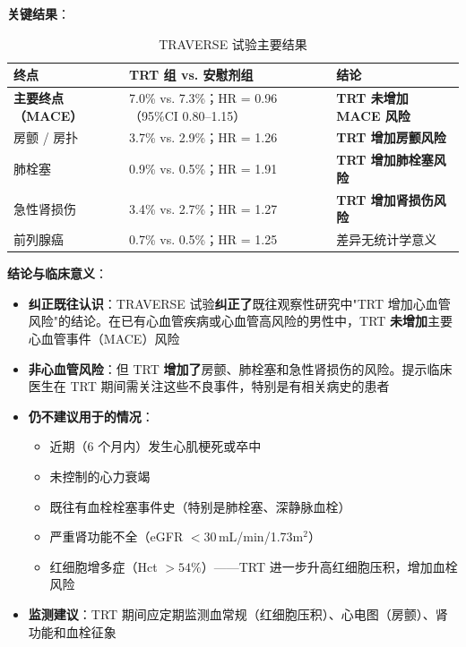 \begin{enumerate}
\vspace{0.5em}
\noindent\textbf{关键结果}：

\begin{table}[htbp]
\centering
\caption{TRAVERSE 试验主要结果}
\label{tab:traverse_results}
\begin{tabularx}{\textwidth}{@{}lXX@{}}
    \toprule
    \textbf{终点} & \textbf{TRT 组 vs. 安慰剂组} & \textbf{结论} \\
    \midrule
    \textbf{主要终点（MACE）} & 7.0\% vs. 7.3\%；HR = 0.96（95\%CI 0.80--1.15） & \textbf{TRT 未增加 MACE 风险} \\
    房颤 / 房扑 & 3.7\% vs. 2.9\%；HR = 1.26 & \textbf{TRT 增加房颤风险} \\
    肺栓塞 & 0.9\% vs. 0.5\%；HR = 1.91 & \textbf{TRT 增加肺栓塞风险} \\
    急性肾损伤 & 3.4\% vs. 2.7\%；HR = 1.27 & \textbf{TRT 增加肾损伤风险} \\
    前列腺癌 & 0.7\% vs. 0.5\%；HR = 1.25 & 差异无统计学意义 \\
    \bottomrule
\end{tabularx}
\end{table}

\vspace{0.5em}
\noindent\textbf{结论与临床意义}：

\begin{itemize}[leftmargin=2cm]
	\item \textbf{纠正既往认识}：TRAVERSE 试验\textbf{纠正了}既往观察性研究中"TRT 增加心血管风险"的结论。在已有心血管疾病或心血管高风险的男性中，TRT \textbf{未增加}主要心血管事件（MACE）风险
	\item \textbf{非心血管风险}：但 TRT \textbf{增加了}房颤、肺栓塞和急性肾损伤的风险。提示临床医生在 TRT 期间需关注这些不良事件，特别是有相关病史的患者
	\item \textbf{仍不建议用于的情况}：
	\begin{itemize}
		\item 近期（6 个月内）发生心肌梗死或卒中
		\item 未控制的心力衰竭
		\item 既往有血栓栓塞事件史（特别是肺栓塞、深静脉血栓）
		\item 严重肾功能不全（eGFR $<30\,$mL/min/1.73m$^2$）
		\item 红细胞增多症（Hct $>54\%$）——TRT 进一步升高红细胞压积，增加血栓风险
	\end{itemize}
	\item \textbf{监测建议}：TRT 期间应定期监测血常规（红细胞压积）、心电图（房颤）、肾功能和血栓征象
\end{itemize}


\end{enumerate}
